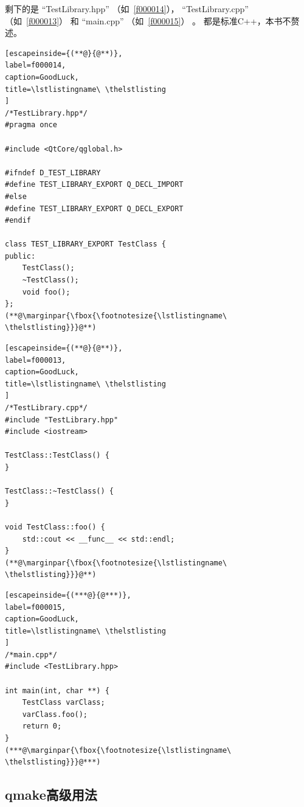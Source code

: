 剩下的是
“TestLibrary.hpp”
（如\lstlistingname\ \ref{f000014}），
“TestLibrary.cpp”
（如\lstlistingname\ \ref{f000013}）
和
“main.cpp”
（如\lstlistingname\ \ref{f000015}）
。
都是标准C{\sourcefonttwo{}+}{\sourcefonttwo{}+}，本书不赘述。
\FloatBarrier
\begin{lstlisting}[escapeinside={(**@}{@**)},
label=f000014,
caption=GoodLuck,
title=\lstlistingname\ \thelstlisting
]
/*TestLibrary.hpp*/
#pragma once

#include <QtCore/qglobal.h>

#ifndef D_TEST_LIBRARY
#define TEST_LIBRARY_EXPORT Q_DECL_IMPORT
#else
#define TEST_LIBRARY_EXPORT Q_DECL_EXPORT
#endif

class TEST_LIBRARY_EXPORT TestClass {
public:
    TestClass();
    ~TestClass();
    void foo();
};
(**@\marginpar{\fbox{\footnotesize{\lstlistingname\ \thelstlisting}}}@**)\end{lstlisting}          %
\FloatBarrier
\begin{lstlisting}[escapeinside={(**@}{@**)},
label=f000013,
caption=GoodLuck,
title=\lstlistingname\ \thelstlisting
]
/*TestLibrary.cpp*/
#include "TestLibrary.hpp"
#include <iostream>

TestClass::TestClass() {
}

TestClass::~TestClass() {
}

void TestClass::foo() {
    std::cout << __func__ << std::endl;
}
(**@\marginpar{\fbox{\footnotesize{\lstlistingname\ \thelstlisting}}}@**)\end{lstlisting}          %
\FloatBarrier
\begin{lstlisting}[escapeinside={(***@}{@***)},
label=f000015,
caption=GoodLuck,
title=\lstlistingname\ \thelstlisting
]
/*main.cpp*/
#include <TestLibrary.hpp>

int main(int, char **) {
    TestClass varClass;
    varClass.foo();
    return 0;
}
(***@\marginpar{\fbox{\footnotesize{\lstlistingname\ \thelstlisting}}}@***)\end{lstlisting}          %


\FloatBarrier
\subsection{
qmake高级用法
}\label{ss000810}


